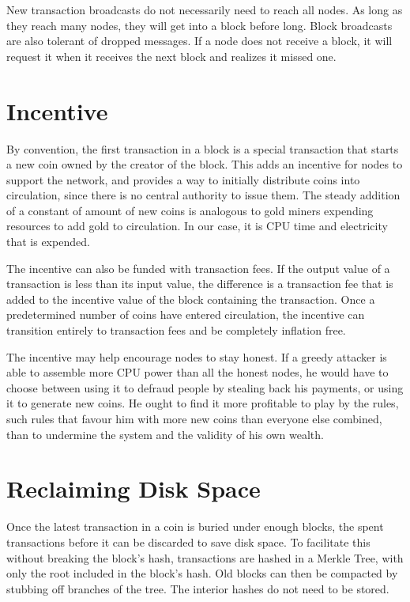 New transaction broadcasts do not necessarily need to reach all nodes. As long as they reach many nodes, they will get into a block before long. Block broadcasts are also tolerant of dropped messages. If a node does not receive a block, it will request it when it receives the next block and realizes it missed one.

\section{Incentive}

By convention, the first transaction in a block is a special transaction that starts a new coin owned by the creator of the block. This adds an incentive for nodes to support the network, and provides a way to initially distribute coins into circulation, since there is no central authority to issue them. The steady addition of a constant of amount of new coins is analogous to gold miners expending resources to add gold to circulation. In our case, it is CPU time and electricity that is expended.

The incentive can also be funded with transaction fees. If the output value of a transaction is less than its input value, the difference is a transaction fee that is added to the incentive value of the block containing the transaction. Once a predetermined number of coins have entered circulation, the incentive can transition entirely to transaction fees and be completely inflation free.

The incentive may help encourage nodes to stay honest. If a greedy attacker is able to assemble more CPU power than all the honest nodes, he would have to choose between using it to defraud people by stealing back his payments, or using it to generate new coins. He ought to find it more profitable to play by the rules, such rules that favour him with more new coins than everyone else combined, than to undermine the system and the validity of his own wealth.

\section{Reclaiming Disk Space}

Once the latest transaction in a coin is buried under enough blocks, the spent transactions before it can be discarded to save disk space. To facilitate this without breaking the block's hash, transactions are hashed in a Merkle Tree, with only the root included in the block's hash. Old blocks can then be compacted by stubbing off branches of the tree. The interior hashes do not need to be stored.

